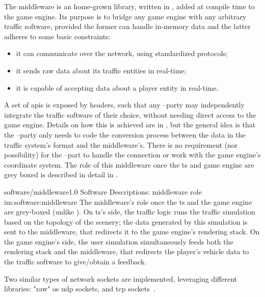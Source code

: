 The middleware is an home-grown library, written in , added at compile time to the game engine. Its purpose is to bridge any game engine with any arbitrary traffic software, provided the former can handle in-memory data and the latter adheres to some basic constraints:

\begin{itemize}
	\item it can communicate over the network, using standardized protocols;
	\item it sends raw data about its traffic entities in real-time;
	\item it is capable of accepting data about a player entity in real-time.
\end{itemize}

A set of \glspl{api} is exposed by  headers, such that any --party may independently integrate the traffic software of their choice, without needing direct access to the game engine. Details on how this is achieved are in , but the general idea is that the --party only needs to code the conversion process between the data in the traffic system's format and the \gls{middleware}'s. There is no requirement (nor possibility) for the --part to handle the connection or work with the game engine's coordinate system. The role of this \gls{middleware} once the \gls{ts} and game engine are grey boxed is described in detail in .

\begin{image}
	{software/middleware}{1.0}
	{Software Descriptions: \gls{middleware} role}
	{im:software:middleware}
	{}
	{The \gls{middleware}'s role once the \gls{ts} and the game engine are grey-boxed (unlike ). On \gls{ts}'s side, the traffic logic runs the traffic simulation based on the topology of the scenery; the data generated by this simulation is sent to the \gls{middleware}, that redirects it to the game engine's rendering stack. On the game engine's side, the user simulation simultaneously feeds both the rendering stack and the middleware, that redirects the player's vehicle data to the traffic software to give/obtain a feedback.}
\end{image}

Two similar types of network sockets are implemented, leveraging different libraries: "raw" \gls{os} \gls{udp} sockets, and  \gls{tcp} sockets~\cite{software:zmq}.

